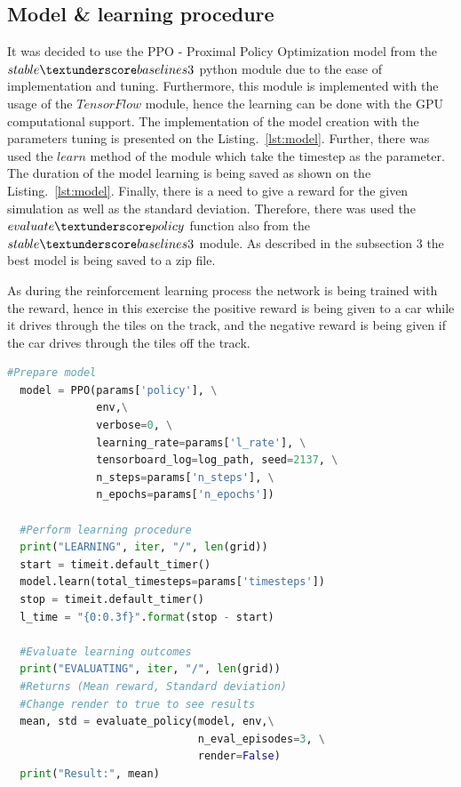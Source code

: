 \documentclass[runningheads]{llncs}
\begin{document}
\subsection{Model \& learning procedure}
It was decided to use the PPO - Proximal Policy Optimization model from the $stable\textunderscore baselines3$ python module due to the ease of implementation and tuning. Furthermore, this module is implemented with the usage of the $TensorFlow$ module, hence the learning can be done with the GPU computational support. The implementation of the model creation with the parameters tuning is presented on the Listing.~\ref{lst:model}. Further, there was used the $learn$ method of the module which take the timestep as the parameter. The duration of the model learning is being saved as shown on the Listing.~\ref{lst:model}. Finally, there is a need to give a reward for the given simulation as well as the standard deviation. Therefore, there was used the $evaluate\textunderscore policy$ function also from the $stable\textunderscore baselines3$ module. As described in the subsection 3 the best model is being saved to a zip file.

As during the reinforcement learning process the network is being trained with the reward, hence in this exercise the positive reward is being given to a car while it drives through the tiles on the track, and the negative reward is being given if the car drives through the tiles off the track.
\begin{lstlisting}[caption={Model creation}, language=Python, label={lst:model}]
  #Prepare model
  model = PPO(params['policy'], \
              env,\
              verbose=0, \
              learning_rate=params['l_rate'], \
              tensorboard_log=log_path, seed=2137, \
              n_steps=params['n_steps'], \
              n_epochs=params['n_epochs'])

  #Perform learning procedure
  print("LEARNING", iter, "/", len(grid))
  start = timeit.default_timer()
  model.learn(total_timesteps=params['timesteps'])
  stop = timeit.default_timer()
  l_time = "{0:0.3f}".format(stop - start)

  #Evaluate learning outcomes
  print("EVALUATING", iter, "/", len(grid))
  #Returns (Mean reward, Standard deviation)
  #Change render to true to see results
  mean, std = evaluate_policy(model, env,\
                              n_eval_episodes=3, \
                              render=False)
  print("Result:", mean)
\end{lstlisting}
\end{document}
